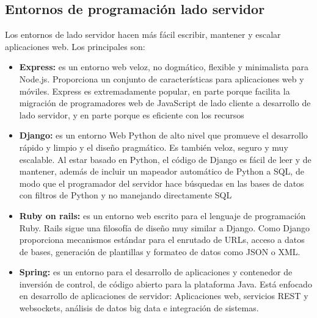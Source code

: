 \subsection{Entornos de programación lado servidor}
Los entornos de lado servidor hacen más fácil escribir, mantener y escalar aplicaciones web. Los principales son:
\begin{itemize}
    \item \textbf{Express: } es un entorno web veloz, no dogmático, flexible y minimalista para Node.js. Proporciona un conjunto de características para aplicaciones web y móviles. Express es extremadamente popular, en parte porque facilita la migración de programadores web de JavaScript de lado cliente a desarrollo de lado servidor, y en parte porque es eficiente con los recursos
    \item \textbf{Django: } es un entorno Web Python de alto nivel que promueve el desarrollo rápido y limpio y el diseño pragmático. Es también veloz, seguro y muy escalable. Al estar basado en Python, el código de Django es fácil de leer y de mantener, además de incluir un mapeador automático de Python a SQL, de modo que el programador del servidor hace búsquedas en las bases de datos con filtros de Python y no manejando directamente SQL
    \item \textbf{Ruby on rails: } es un entorno web escrito para el lenguaje de programación Ruby. Rails sigue una filosofía de diseño muy similar a Django. Como Django proporciona mecanismos estándar  para el enrutado de URLs, acceso a datos de bases, generación de plantillas y formateo de datos como JSON o XML.
    \item \textbf{Spring: } es un entorno para el desarrollo de aplicaciones y contenedor de inversión de control, de código abierto para la plataforma Java. Está enfocado en desarrollo de aplicaciones de servidor: Aplicaciones web, servicios REST y websockets, análisis de datos big data e integración de sistemas.
\end{itemize}
